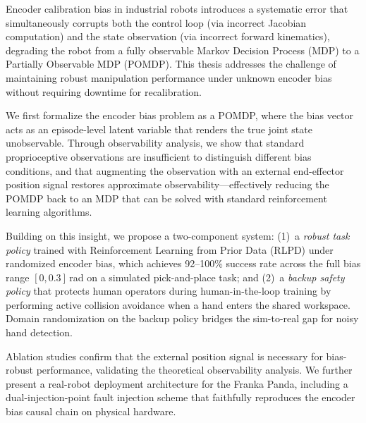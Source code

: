 
Encoder calibration bias in industrial robots introduces a systematic error that simultaneously corrupts both the control loop (via incorrect Jacobian computation) and the state observation (via incorrect forward kinematics), degrading the robot from a fully observable Markov Decision Process (MDP) to a Partially Observable MDP (POMDP). This thesis addresses the challenge of maintaining robust manipulation performance under unknown encoder bias without requiring downtime for recalibration.

We first formalize the encoder bias problem as a POMDP, where the bias vector acts as an episode-level latent variable that renders the true joint state unobservable. Through observability analysis, we show that standard proprioceptive observations are insufficient to distinguish different bias conditions, and that augmenting the observation with an external end-effector position signal restores approximate observability---effectively reducing the POMDP back to an MDP that can be solved with standard reinforcement learning algorithms.

Building on this insight, we propose a two-component system: (1)~a \emph{robust task policy} trained with Reinforcement Learning from Prior Data (RLPD) under randomized encoder bias, which achieves 92--100\% success rate across the full bias range $[0, 0.3]$\,rad on a simulated pick-and-place task; and (2)~a \emph{backup safety policy} that protects human operators during human-in-the-loop training by performing active collision avoidance when a hand enters the shared workspace. Domain randomization on the backup policy bridges the sim-to-real gap for noisy hand detection.

Ablation studies confirm that the external position signal is necessary for bias-robust performance, validating the theoretical observability analysis. We further present a real-robot deployment architecture for the Franka Panda, including a dual-injection-point fault injection scheme that faithfully reproduces the encoder bias causal chain on physical hardware.


